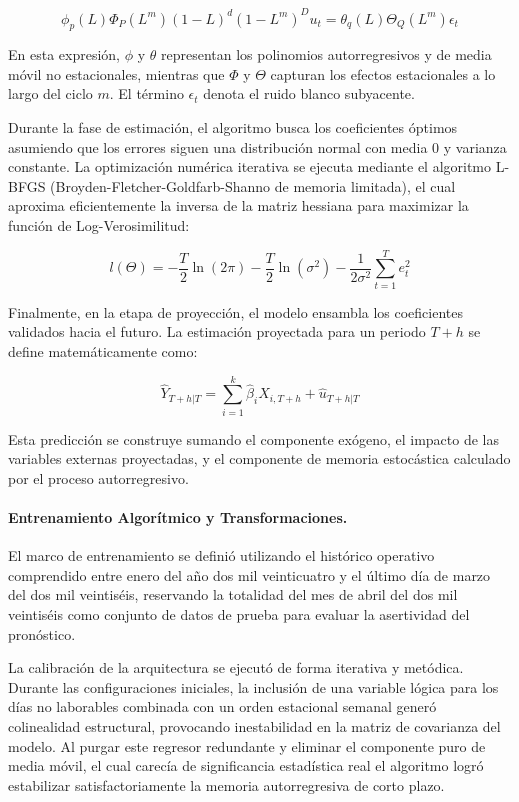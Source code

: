 \documentclass[11pt,a4paper]{report}
\begin{document}
        $$\phi_{p}(L)\Phi_{P}(L^{m})(1-L)^{d}(1-L^{m})^{D}u_{t}=\theta_{q}(L)\Theta_{Q}(L^{m})\epsilon_{t}$$

        En esta expresión, $\phi$ y $\theta$ representan los polinomios autorregresivos y de media móvil no estacionales, 
        mientras que $\Phi$ y $\Theta$ capturan los efectos estacionales a lo largo del ciclo $m$. El término $\epsilon_{t}$ 
        denota el ruido blanco subyacente.

        Durante la fase de estimación, el algoritmo busca los coeficientes óptimos asumiendo que los errores siguen una distribución
        normal con media 0 y varianza constante. La optimización numérica iterativa se ejecuta mediante el algoritmo 
        L-BFGS (Broyden-Fletcher-Goldfarb-Shanno de memoria limitada), el cual aproxima eficientemente la inversa de la matriz hessiana 
        para maximizar la función de Log-Verosimilitud:

        $$l(\Theta)=-\frac{T}{2}\ln(2\pi)-\frac{T}{2}\ln(\sigma^{2})-\frac{1}{2\sigma^{2}}\sum_{t=1}^{T}e_{t}^{2}$$

        Finalmente, en la etapa de proyección, el modelo ensambla los coeficientes validados hacia el futuro.
        La estimación proyectada para un periodo $T+h$ se define matemáticamente como:

        $$\hat{Y}_{T+h|T}=\sum_{i=1}^{k}\hat{\beta}_{i}X_{i,T+h}+\hat{u}_{T+h|T}$$

        Esta predicción se construye sumando el componente exógeno, el impacto de las variables externas proyectadas, y el componente de
        memoria estocástica calculado por el proceso autorregresivo.


        \paragraph{Entrenamiento Algorítmico y Transformaciones.}
        El marco de entrenamiento se definió utilizando el histórico operativo comprendido entre enero del año dos mil veinticuatro y 
        el último día de marzo del dos mil veintiséis, reservando la totalidad del mes de abril del dos mil veintiséis como conjunto de datos
        de prueba para evaluar la asertividad del pronóstico.

        La calibración de la arquitectura se ejecutó de forma iterativa y metódica. Durante las configuraciones iniciales,
        la inclusión de una variable lógica para los días no laborables combinada con un orden estacional semanal generó colinealidad
        estructural, provocando inestabilidad en la matriz de covarianza del modelo. Al purgar este regresor redundante y eliminar
        el componente puro de media móvil, el cual carecía de significancia estadística real el algoritmo logró estabilizar satisfactoriamente
        la memoria autorregresiva de corto plazo. 
\end{document}

